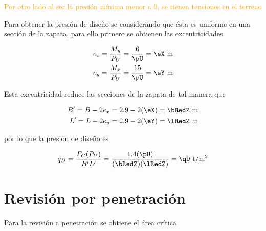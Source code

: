\documentclass[11pt,a4paper,fleqn]{article}
\begin{document}
 \qMin   \; \textcolor{orange}{Por otro lado al ser la presión mínima menor a 0, se tienen tensiones en el terreno} \fi


Para obtener la presión de diseño se considerando que ésta es uniforme en una sección de la zapata, para ello primero se obtienen las excentricidades


\begin{align*}
	e_x=\frac{M_y}{P_U}=\frac{\myZ}{\pU}=\eX \text{ m}\\
	e_y=\frac{M_x}{P_U}=\frac{\mxZ}{\pU}=\eY \text{ m}
\end{align*}

Esta excentricidad reduce las secciones de la zapata de tal manera que


\begin{align*}
	B'=B-2e_x=\bZ-2(\eX)=\bRedZ \text{ m}\\
	L'=L-2e_y=\lZ-2(\eY)=\lRedZ \text{ m}
\end{align*}

por lo que la presión de diseño es

\begin{align*}
	q_D=\frac{F_C(P_U)}{B'L'}=\frac{\fcCarga(\pU)}{(\bRedZ)(\lRedZ)}=\qD \text{ t/m$^2$}
\end{align*}


\section{Revisión por penetración}
Para la revisión a penetración se obtiene el área crítica
\end{document}

